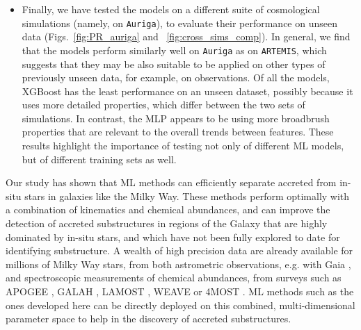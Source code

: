 \begin{itemize}
    \item  Finally, we have tested the models on a different suite of cosmological simulations (namely, on \texttt{Auriga}), to evaluate their performance on unseen data (Figs.~\ref{fig:PR_auriga} and ~\ref{fig:cross_sims_comp}). In general, we find that the models perform similarly well on \texttt{Auriga} as on \texttt{ARTEMIS}, which suggests that they may be also suitable to be applied on other types of previously unseen data, for example, on observations. Of all the models, XGBoost has the least performance on an unseen dataset, possibly because it uses more detailed properties, which differ between the two sets of simulations. In contrast, the MLP appears to be using more broadbrush properties that are relevant to the overall trends between features.  These results highlight the importance of testing not only of different ML models, but of different training sets as well.

\end{itemize}

Our study has shown that ML methods can efficiently separate accreted from in-situ stars in galaxies like the Milky Way. These methods perform optimally with a combination of kinematics and chemical abundances, and can improve the detection of accreted substructures in regions of the Galaxy that are highly dominated by in-situ stars, and which have not been fully explored to date for identifying substructure. A wealth of high precision data are already available for millions of Milky Way stars, from both astrometric observations, e.g. with Gaia  \citep{GaiaCollaboration2018,GaiaCollaboration2023a}, and spectroscopic measurements of chemical abundances, from surveys such as APOGEE \citep{Majewski2017}, GALAH \citep{DeSilva2015}, LAMOST \citep{Zhao2012},  WEAVE \citep{Dalton2014} or 4MOST \citep{deJong2019}. ML methods such as the ones developed here can be directly deployed on this combined, multi-dimensional parameter space to help in the discovery of accreted substructures.

